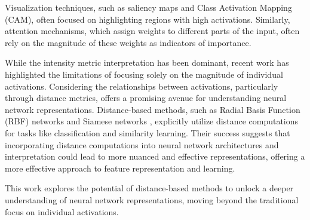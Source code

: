 Visualization techniques, such as saliency maps and Class Activation Mapping (CAM), often focused on highlighting regions with high activations. Similarly, attention mechanisms, which assign weights to different parts of the input, often rely on the magnitude of these weights as indicators of importance.

While the intensity metric interpretation has been dominant, recent work has highlighted the limitations of focusing solely on the magnitude of individual activations. \citep{rudin2019stop} Considering the relationships between activations, particularly through distance metrics, offers a promising avenue for understanding neural network representations. \citep{goodfellow2014explaining,madry2017towards,szegedy2013intriguing} Distance-based methods, such as Radial Basis Function (RBF) networks \citep{broomhead1988radial} and Siamese networks \citep{bromley1994signature,schroff2015facenet}, explicitly utilize distance computations for tasks like classification and similarity learning. Their success suggests that incorporating distance computations into neural network architectures and interpretation could lead to more nuanced and effective representations, offering a more effective approach to feature representation and learning.

This work explores the potential of distance-based methods to unlock a deeper understanding of neural network representations, moving beyond the traditional focus on individual activations.